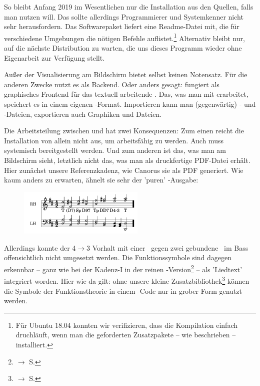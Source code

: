 So bleibt Anfang 2019 im Wesentlichen nur die Installation aus den Quellen,
falls man  nutzen will. Das sollte allerdings Programmierer und
Systemkenner nicht sehr herausfordern. Das Softwarepaket liefert eine
Readme-Datei mit, die für verschiedene Umgebungen die nötigen Befehle
auflistet.\footnote{Für Ubuntu 18.04 konnten wir verifizieren, dass die
Kompilation einfach druchläuft, wenn man die geforderten Zusatzpakete -- wie
beschrieben -- installiert.} Alternativ bleibt nur, auf die nächste
Distribution zu warten, die uns dieses Programm wieder ohne Eigenarbeit zur
Verfügung stellt.

Außer der Visualisierung am Bildschirm bietet  selbst keinen
Notensatz. Für die anderen Zwecke nutzt es  als Backend. Oder
anders gesagt:  fungiert als graphisches Frontend für das textuell
arbeitende . Das, was man mit  erarbeitet, speichert
es in einem eigenen -Format. Importieren kann man (gegenwärtig) 
- und -Dateien, exportieren auch Graphiken und
Dateien.

Die Arbeitsteilung zwischen  und  hat zwei
Konsequenzen: Zum einen reicht die Installation von  allein nicht
aus, um arbeitsfähig zu werden. Auch   muss systemisch
bereitgestellt werden. Und zum anderen ist das, was man am Bildschirm sieht,
letztlich nicht das, was man als druckfertige PDF-Datei erhält. Hier zunächst
unsere Referenzkadenz, wie Canorus sie als PDF generiert. Wie kaum anders zu
erwarten, ähnelt sie sehr der 'puren' -Ausgabe:

\begin{figure}
\includegraphics[width=6cm]{frontends/canorus/cadenca2-pdf-300dpi.png}
\end{figure}
Allerdings konnte der 4$\rightarrow$3 Vorhalt mit einer \Halb\ gegen zwei
gebundene \Vier\ im Bass offensichtlich nicht umgesetzt werden. Die
Funktionssymbole sind dagegen erkennbar -- ganz wie bei der Kadenz-I in der
reinen -Version\footnote{$\rightarrow$ S.
\pageref{LilyPondKadenzI}} -- als 'Liedtext' integriert worden. Hier wie da
gilt: ohne unsere kleine Zusatzbibliothek\footnote{$\rightarrow$ S.
\pageref{LilyPondFuncTheory}} können die Symbole der Funktionstheorie in einem
-Code nur in grober Form genutzt werden.

